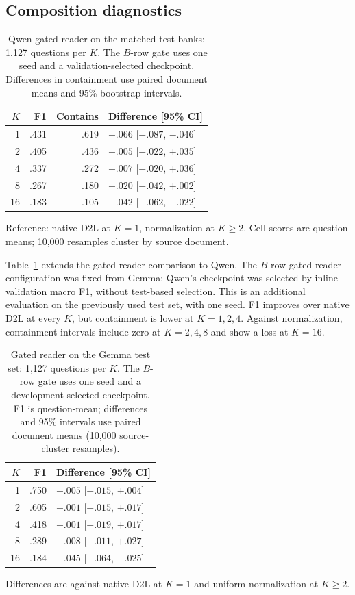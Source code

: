 \subsection{Composition diagnostics}
\begin{table}[t]
\centering
\caption{Qwen gated reader on the matched test banks: 1,127 questions per $K$.
The $B$-row gate uses one seed and a validation-selected checkpoint.
Differences in containment
use paired document means and 95\% bootstrap intervals.}
\label{tab:qwen-gated-test}
\small\setlength{\tabcolsep}{3pt}
\begin{tabular}{@{}rrrl@{}}
\toprule
$K$ & F1 & Contains & Difference [95\% CI] \\
\midrule
1 & .431 & .619 & $-.066$ [$-.087$, $-.046$] \\
2 & .405 & .436 & $+.005$ [$-.022$, $+.035$] \\
4 & .337 & .272 & $+.007$ [$-.020$, $+.036$] \\
8 & .267 & .180 & $-.020$ [$-.042$, $+.002$] \\
16 & .183 & .105 & $-.042$ [$-.062$, $-.022$] \\
\bottomrule
\end{tabular}
\par\smallskip
\raggedright Reference: native D2L at $K=1$, normalization at $K\geq2$.
Cell scores are question means; 10,000 resamples cluster by source document.
\end{table}

Table~\ref{tab:qwen-gated-test} extends the gated-reader comparison to Qwen.
The $B$-row gated-reader configuration was fixed from Gemma; Qwen's checkpoint was selected by inline
validation macro F1, without test-based selection. This is an additional
evaluation on the previously used test set, with one seed.
F1 improves over native D2L at every $K$, but containment is lower at
$K=1,2,4$. Against normalization, containment intervals include zero at
$K=2,4,8$ and show a loss at $K=16$.

\begin{table}[t]
\centering
\caption{Gated reader on the Gemma test set: 1,127 questions per $K$.
The $B$-row gate uses one seed and a development-selected checkpoint.
F1 is question-mean; differences and 95\% intervals use paired document means
(10,000 source-cluster resamples).}
\label{tab:gated-test}
\small\setlength{\tabcolsep}{3pt}
\begin{tabular}{@{}rrl@{}}
\toprule
$K$ & F1 & Difference [95\% CI] \\
\midrule
1 & .750 & $-.005$ [$-.015$, $+.004$] \\
2 & .605 & $+.001$ [$-.015$, $+.017$] \\
4 & .418 & $-.001$ [$-.019$, $+.017$] \\
8 & .289 & $+.008$ [$-.011$, $+.027$] \\
16 & .184 & $-.045$ [$-.064$, $-.025$] \\
\bottomrule
\end{tabular}
\par\smallskip
\raggedright Differences are against native D2L at $K=1$ and
uniform normalization at $K\geq2$.
\end{table}

